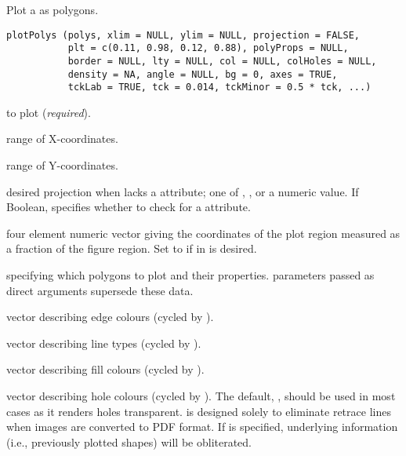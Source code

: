 \documentclass[letterpaper]{book}
\begin{document}
%
\begin{Description}\relax
Plot a  as polygons.
\end{Description}
%
\begin{Usage}
\begin{verbatim}
plotPolys (polys, xlim = NULL, ylim = NULL, projection = FALSE,
           plt = c(0.11, 0.98, 0.12, 0.88), polyProps = NULL,
           border = NULL, lty = NULL, col = NULL, colHoles = NULL,
           density = NA, angle = NULL, bg = 0, axes = TRUE,
           tckLab = TRUE, tck = 0.014, tckMinor = 0.5 * tck, ...)
\end{verbatim}
\end{Usage}
%
\begin{Arguments}
\begin{ldescription}
\item[\code{polys}]  to plot (\emph{required}).
\item[\code{xlim}] range of X-coordinates.
\item[\code{ylim}] range of Y-coordinates.
\item[\code{projection}] desired projection when  lacks a
 attribute; one of , ,
or a numeric value.  If Boolean, specifies whether to check
 for a  attribute.
\item[\code{plt}] four element numeric vector  giving
the coordinates of the plot region measured as a fraction of the
figure region. Set to  if  in  is
desired.
\item[\code{polyProps}]  specifying which polygons to
plot and their properties.   parameters passed as
direct arguments supersede these data.
\item[\code{border}] vector describing edge colours (cycled by ).
\item[\code{lty}] vector describing line types (cycled by ).
\item[\code{col}] vector describing fill colours (cycled by ).
\item[\code{colHoles}] vector describing hole colours (cycled by ).
The default, , should be used in most cases as it renders holes 
transparent.  is designed solely to eliminate retrace lines 
when images are converted to PDF format. If  is specified, 
underlying information (i.e., previously plotted shapes) will be obliterated.

\end{ldescription}
\end{Arguments}
\end{document}

